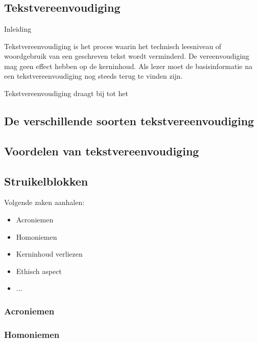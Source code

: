 \chapter{}%
\label{ch:stand-van-zaken}

\section{Tekstvereenvoudiging}

Inleiding

Tekstvereenvoudiging is het proces waarin het technisch leesniveau of woordgebruik van een geschreven tekst wordt verminderd. De vereenvoudiging mag geen effect hebben op de kerninhoud. Als lezer moet de basisinformatie na een tekstvereenvoudiging nog steeds terug te vinden zijn.

Tekstvereenvoudiging draagt bij tot het 

\section{De verschillende soorten tekstvereenvoudiging}

\section{Voordelen van tekstvereenvoudiging}

\section{Struikelblokken}

Volgende zaken aanhalen:
\begin{itemize}
	\item Acroniemen
	\item Homoniemen
	\item Kerninhoud verliezen
	\item Ethisch aspect
	\item ...
\end{itemize}

\subsection{Acroniemen}

\subsection{Homoniemen}


